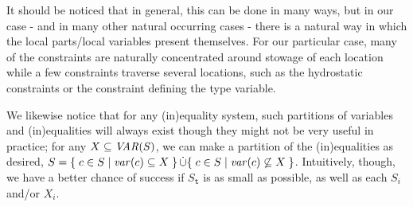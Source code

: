 It should be noticed that in general, this can be done in many ways, but in our case - and in many other natural occurring cases - there is a natural way in which the local parts/local variables present themselves. For our particular case, many of the constraints are naturally concentrated around stowage of each location while a few constraints traverse several locations, such as the hydrostatic constraints or the constraint defining the type variable.
   
We likewise notice that for any (in)equality system, such partitions of variables and (in)equalities will always exist though they might not be very useful in practice; 
for any $X\subseteq \mathit{VAR}(S)$, we can make a partition of the (in)equalities as desired, $S = \{\;{c\in S}\;|\;{\mathit{var}(c)\subseteq X}\;\}\,\dot\cup \{\;{c\in S}\;|\;{\mathit{var}(c)\not\subseteq X}\;\}$.
Intuitively, though, we have a better chance of success if $S_\texttt{t}$ is as small as possible, as well as each $S_i$ and/or $X_i$.

